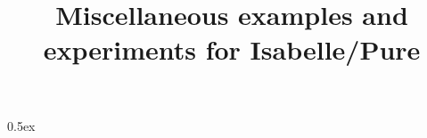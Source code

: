 \documentclass[10pt,a4paper]{report}
\begin{document}
\title{Miscellaneous examples and experiments for Isabelle/Pure}
\maketitle

\parindent 0pt \parskip 0.5ex


\end{document}

